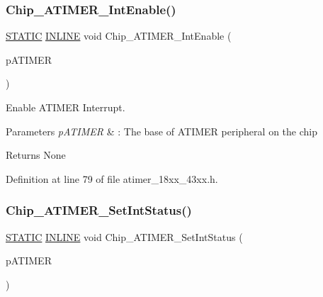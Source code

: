 \subsubsection{\texorpdfstring{Chip\+\_\+\+A\+T\+I\+M\+E\+R\+\_\+\+Int\+Enable()}{Chip\_ATIMER\_IntEnable()}}
{\footnotesize\ttfamily \hyperlink{group___l_p_c___types___public___macros_ga10b2d890d871e1489bb02b7e70d9bdfb}{S\+T\+A\+T\+IC} \hyperlink{spifi__18xx__43xx_8h_a2eb6f9e0395b47b8d5e3eeae4fe0c116}{I\+N\+L\+I\+NE} void Chip\+\_\+\+A\+T\+I\+M\+E\+R\+\_\+\+Int\+Enable (\begin{DoxyParamCaption}\item[{\hyperlink{struct_l_p_c___a_t_i_m_e_r___t}{L\+P\+C\+\_\+\+A\+T\+I\+M\+E\+R\+\_\+T} $\ast$}]{p\+A\+T\+I\+M\+ER }\end{DoxyParamCaption})}



Enable A\+T\+I\+M\+ER Interrupt. 


\begin{DoxyParams}{Parameters}
{\em p\+A\+T\+I\+M\+ER} & \+: The base of A\+T\+I\+M\+ER peripheral on the chip \\
\hline
\end{DoxyParams}
\begin{DoxyReturn}{Returns}
None 
\end{DoxyReturn}


Definition at line 79 of file atimer\+\_\+18xx\+\_\+43xx.\+h.

\mbox{\label{group___a_t_i_m_e_r__18_x_x__43_x_x_gab14af39f45e3b5c3e029d653476142db}} 
\subsubsection{\texorpdfstring{Chip\+\_\+\+A\+T\+I\+M\+E\+R\+\_\+\+Set\+Int\+Status()}{Chip\_ATIMER\_SetIntStatus()}}
{\footnotesize\ttfamily \hyperlink{group___l_p_c___types___public___macros_ga10b2d890d871e1489bb02b7e70d9bdfb}{S\+T\+A\+T\+IC} \hyperlink{spifi__18xx__43xx_8h_a2eb6f9e0395b47b8d5e3eeae4fe0c116}{I\+N\+L\+I\+NE} void Chip\+\_\+\+A\+T\+I\+M\+E\+R\+\_\+\+Set\+Int\+Status (\begin{DoxyParamCaption}\item[{\hyperlink{struct_l_p_c___a_t_i_m_e_r___t}{L\+P\+C\+\_\+\+A\+T\+I\+M\+E\+R\+\_\+T} $\ast$}]{p\+A\+T\+I\+M\+ER }\end{DoxyParamCaption})}



